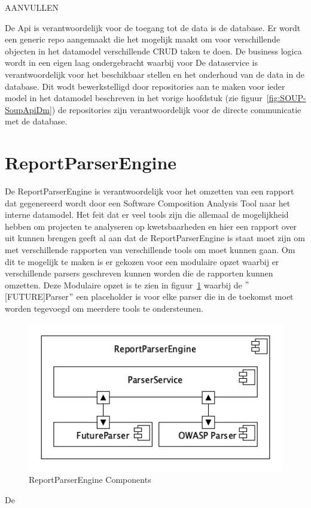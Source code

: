 AANVULLEN



De Api is verantwoordelijk voor de toegang tot de data is de database.
Er wordt een generic repo aangemaakt die het mogelijk maakt om voor verschillende objecten in het datamodel verschillende CRUD taken te doen. De business logica wordt in een eigen laag ondergebracht waarbij voor
De dataservice is verantwoordelijk voor het beschikbaar stellen en het onderhoud van de data in de database. Dit wodt bewerkstelligd door repositories aan te maken voor ieder model in het datamodel beschreven in het vorige hoofdstuk (zie figuur~\ref{fig:SOUP-SoupApiDm}) de repositories zijn verantwoordelijk voor de directe communicatie met de database.

\section{ReportParserEngine}\label{sec:reportparserengine}
De ReportParserEngine is verantwoordelijk voor het omzetten van een rapport dat gegenereerd wordt door een Software Composition Analysis Tool naar het interne datamodel. Het feit dat er veel tools zijn die allemaal de mogelijkheid hebben om projecten te analyseren op kwetsbaarheden en hier een rapport over uit kunnen brengen geeft al aan dat de ReportParserEngine is staat moet zijn om met verschillende rapporten van verschillende tools om moet kunnen gaan. Om dit te mogelijk te maken  is er gekozen voor een modulaire opzet waarbij er verschillende parsers geschreven kunnen worden die de rapporten kunnen omzetten. Deze Modulaire opzet is te zien in figuur~\ref{fig:ReportParserComponents} waarbij de $"$[FUTURE]Parser$"$ een placeholder is voor elke parser die in de toekomst moet worden tegevoegd om meerdere tools te ondersteunen.
\begin{figure}[bth]
    \myfloatalign
    \includegraphics[width=12cm]{gfx/umlet/exports/ReportParserComponents}
    \caption{ReportParserEngine Components}
    \label{fig:ReportParserComponents}
\end{figure}
De


